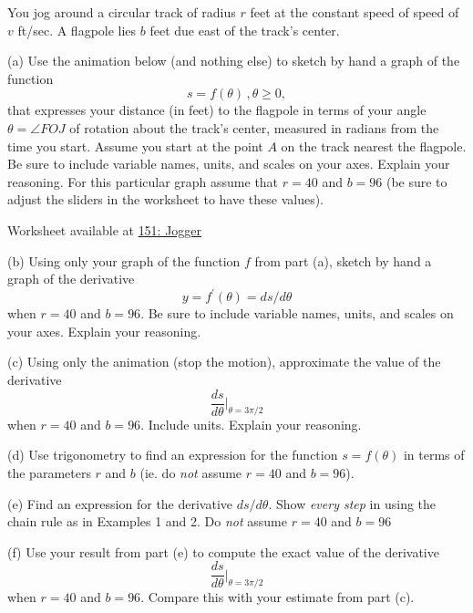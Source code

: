 \documentclass{ximera}
\begin{document}
\begin{exercise}  \label{Ex:dsfthnmmm}
You jog around a circular track of radius $r$ feet at the constant speed of speed of $v$ ft/sec. A flagpole lies $b$ feet due east of the track's center.

(a) Use the animation below (and nothing else) to sketch by hand a graph of the function 
\[
   s = f(\theta) \, , \theta \geq 0,
\]
that expresses your distance (in feet) to the flagpole in terms of your angle $\theta = \angle FOJ$ of rotation about the track's center, measured in radians from the time you start. Assume you start at the point $A$ on the track nearest the flagpole. Be sure to include variable names, units, and scales on your axes. Explain your reasoning. For this particular graph assume that $r=40$ and $b=96$ (be sure to adjust the sliders in the worksheet to have these values).

\begin{onlineOnly}
    \begin{center}
\end{center}
\end{onlineOnly}

Worksheet available at \href{https://www.desmos.com/calculator/4pndurvhdd}{151: Jogger}

(b) Using only your graph of the function $f$ from part (a), sketch by hand a graph of the derivative
\[
    y = f^\prime(\theta) = ds/d\theta
\]
when $r=40$ and $b=96$. Be sure to include variable names, units, and scales on your axes. Explain your reasoning.

(c) Using only the animation (stop the motion), approximate the value of the derivative
\[
     \frac{ds}{d\theta} \Big|_{\theta = 3\pi/2} 
\]
when $r=40$ and $b=96$. Include units. Explain your reasoning.

(d) Use trigonometry to find an expression for the function $s=f(\theta)$ in terms of the parameters $r$ and $b$ (ie. do \emph{not} assume $r=40$ and $b=96$).

(e) Find an expression for the derivative $ds/d\theta$. Show \emph{every step} in using the chain rule as in Examples 1 and 2. Do \emph{not} assume $r=40$ and $b=96$ %

(f) Use your result from part (e) to compute the exact value of the derivative
\[
     \frac{ds}{d\theta} \Big|_{\theta = 3\pi/2}  
\]
when $r=40$ and $b=96$. Compare this with your estimate from part (c).


\end{exercise}
\end{document}
